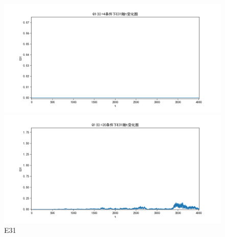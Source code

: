 \documentclass[10pt, a4paper]{article}
\begin{document}
    \begin{figure}[H]
        \begin{minipage}[t]{0.49\textwidth}
            \centering
            \includegraphics[width=\textwidth]{./q5_pics/cmp/E31.png}
        \end{minipage}
        \begin{minipage}[t]{0.49\textwidth}
            \centering
            \includegraphics[width=\textwidth]{./q5_pics/exp/E31.png}
        \end{minipage}
        \caption{E31}\label{fig:E31 in q5}
    \end{figure}
\end{document}
